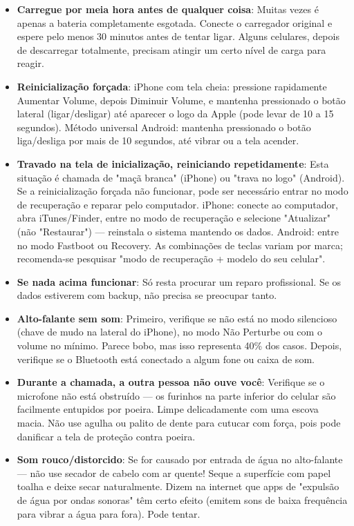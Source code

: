 \begin{itemize}
  \item \textbf{Carregue por meia hora antes de qualquer coisa}: Muitas vezes é apenas a bateria completamente esgotada. Conecte o carregador original e espere pelo menos 30 minutos antes de tentar ligar. Alguns celulares, depois de descarregar totalmente, precisam atingir um certo nível de carga para reagir.
  \item \textbf{Reinicialização forçada}: iPhone com tela cheia: pressione rapidamente Aumentar Volume, depois Diminuir Volume, e mantenha pressionado o botão lateral (ligar/desligar) até aparecer o logo da Apple (pode levar de 10 a 15 segundos). Método universal Android: mantenha pressionado o botão liga/desliga por mais de 10 segundos, até vibrar ou a tela acender.
  \item \textbf{Travado na tela de inicialização, reiniciando repetidamente}: Esta situação é chamada de "maçã branca" (iPhone) ou "trava no logo" (Android). Se a reinicialização forçada não funcionar, pode ser necessário entrar no modo de recuperação e reparar pelo computador. iPhone: conecte ao computador, abra iTunes/Finder, entre no modo de recuperação e selecione "Atualizar" (não "Restaurar") — reinstala o sistema mantendo os dados. Android: entre no modo Fastboot ou Recovery. As combinações de teclas variam por marca; recomenda-se pesquisar "modo de recuperação + modelo do seu celular".
  \item \textbf{Se nada acima funcionar}: Só resta procurar um reparo profissional. Se os dados estiverem com backup, não precisa se preocupar tanto.
\end{itemize}


\begin{itemize}
  \item \textbf{Alto-falante sem som}: Primeiro, verifique se não está no modo silencioso (chave de mudo na lateral do iPhone), no modo Não Perturbe ou com o volume no mínimo. Parece bobo, mas isso representa 40\% dos casos. Depois, verifique se o Bluetooth está conectado a algum fone ou caixa de som.
  \item \textbf{Durante a chamada, a outra pessoa não ouve você}: Verifique se o microfone não está obstruído — os furinhos na parte inferior do celular são facilmente entupidos por poeira. Limpe delicadamente com uma escova macia. Não use agulha ou palito de dente para cutucar com força, pois pode danificar a tela de proteção contra poeira.
  \item \textbf{Som rouco/distorcido}: Se for causado por entrada de água no alto-falante — não use secador de cabelo com ar quente! Seque a superfície com papel toalha e deixe secar naturalmente. Dizem na internet que apps de "expulsão de água por ondas sonoras" têm certo efeito (emitem sons de baixa frequência para vibrar a água para fora). Pode tentar.
\end{itemize}

